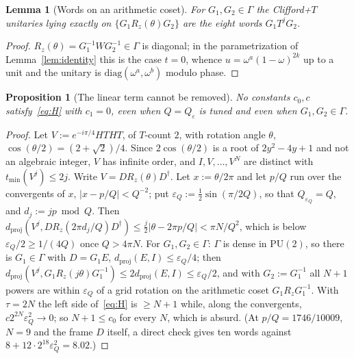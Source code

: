 \documentclass[aps,prx,twocolumn,superscriptaddress,nofootinbib,longbibliography]{revtex4-2}
\theoremstyle{plain}
\newtheorem{lemma}{Lemma}
\newtheorem{proposition}{Proposition}
\theoremstyle{definition}
\theoremstyle{remark}
\newcommand{\dproj}{d_{\mathrm{proj}}}
\newcommand{\PU}{\mathrm{PU}(2)}
\begin{document}
\begin{lemma}[Words on an arithmetic coset]\label{lem:arith}
For $G_1,G_2\in\Gamma$ the Clifford+$T$ unitaries lying exactly on $\{G_1R_z(\theta)G_2\}$ are the eight words $G_1T^jG_2$.
\end{lemma}
\begin{proof}
$R_z(\theta)=G_1^{-1}WG_2^{-1}\in\Gamma$ is diagonal; in the parametrization of Lemma~\ref{lem:identity} this is the case $t=0$, whence $u=\omega^a(1-\omega)^{2k}$ up to a unit and the unitary is $\mathrm{diag}(\omega^a,\omega^b)$ modulo phase.
\end{proof}

\begin{proposition}[The linear term cannot be removed]\label{prop:cluster}
No constants $c_0,c$ satisfy~\eqref{eq:H} with $c_1=0$, even when $Q=Q_\varepsilon$ is tuned and even when $G_1,G_2\in\Gamma$.
\end{proposition}
\begin{proof}
Let $V:=e^{-i\pi/4}HTHT$, of $T$-count $2$, with rotation angle $\theta$, $\cos(\theta/2)=(2+\sqrt2)/4$. Since $2\cos(\theta/2)$ is a root of $2y^2-4y+1$ and not an algebraic integer, $V$ has infinite order, and $I,V,\dots,V^N$ are distinct with $t_{\min}(V^j)\le2j$. Write $V=DR_z(\theta)D^\dagger$. Let $x:=\theta/2\pi$ and let $p/Q$ run over the convergents of $x$, $|x-p/Q|<Q^{-2}$; put $\varepsilon_Q:=\tfrac12\sin(\pi/2Q)$, so that $Q_{\varepsilon_Q}=Q$, and $d_j:=jp\bmod Q$. Then $\dproj(V^j,DR_z(2\pi d_j/Q)D^\dagger)\le\tfrac j2|\theta-2\pi p/Q|<\pi N/Q^2$, which is below $\varepsilon_Q/2\ge1/(4Q)$ once $Q>4\pi N$. For $G_1,G_2\in\Gamma$: $\Gamma$ is dense in $\PU$, so there is $G_1\in\Gamma$ with $D=G_1E$, $\dproj(E,I)\le\varepsilon_Q/4$; then $\dproj(V^j,G_1R_z(j\theta)G_1^{-1})\le2\dproj(E,I)\le\varepsilon_Q/2$, and with $G_2:=G_1^{-1}$ all $N+1$ powers are within $\varepsilon_Q$ of a grid rotation on the arithmetic coset $G_1R_zG_1^{-1}$. With $\tau=2N$ the left side of~\eqref{eq:H} is $\ge N+1$ while, along the convergents, $c2^{2N}\varepsilon_Q^2\to0$; so $N+1\le c_0$ for every $N$, which is absurd. (At $p/Q=1746/10009$, $N=9$ and the frame $D$ itself, a direct check gives ten words against $8+12\cdot2^{18}\varepsilon_Q^2=8.02$.)
\end{proof}
\end{document}
